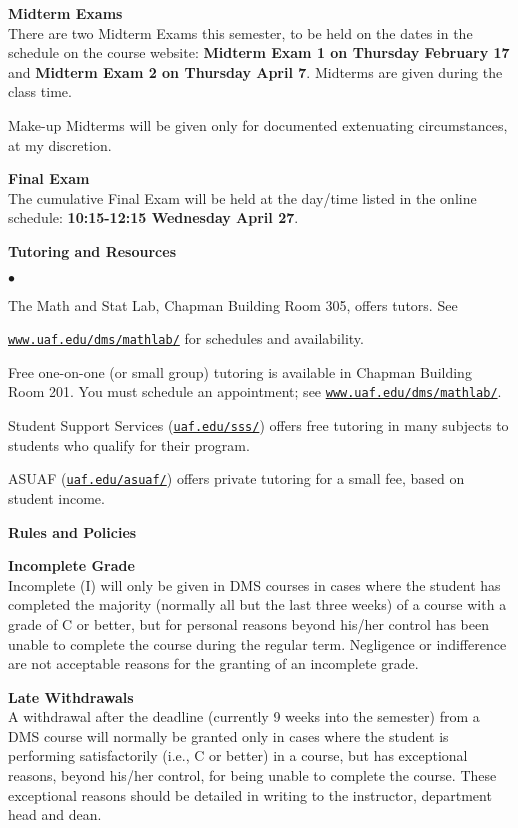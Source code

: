\documentclass[12pt]{article}
\renewcommand{\emph}[1]{\textsf{\textbf{#1}}}
\newcommand{\localhead}[1]{\par\smallskip\textbf{#1} \smallskip\nobreak\\}%
\def\heading#1{\localhead{\large\emph{#1}}}
\def\subheading#1{\localhead{\emph{#1}}}
\newenvironment{clist}%
{\bgroup\parskip 0pt\begin{list}{$\bullet$}{\partopsep 4pt\topsep 0pt\itemsep -2pt}}%
{\end{list}\egroup}%
\begin{document}
\heading{Midterm Exams}
There are two Midterm Exams this semester, to be held on the dates in the schedule on the course website: \emph{Midterm Exam 1 on Thursday February 17} and \emph{Midterm Exam 2 on Thursday April 7}.  Midterms are given during the class time.

Make-up Midterms will be given only for documented extenuating circumstances, at my discretion.


\heading{Final Exam} 
The cumulative Final Exam will be held at the day/time listed in the online schedule: \textbf{10:15-12:15 Wednesday April 27}.


\heading{Tutoring and Resources}
\vskip -30pt\strut
\begin{clist}
	\item The Math and Stat Lab, Chapman Building Room 305, offers tutors. 
	See 

	\href{http://www.uaf.edu/dms/mathlab/}{\texttt{www.uaf.edu/dms/mathlab/}} for schedules and availability.
	\item Free
one-on-one (or small group) tutoring is available in 
Chapman Building Room 201. You must schedule an
appointment; see \href{http://www.uaf.edu/dms/mathlab/}{\texttt{www.uaf.edu/dms/mathlab/}}.
	\item Student Support Services (\href{https://uaf.edu/sss/}{\texttt{uaf.edu/sss/}}) offers free tutoring in many subjects to students who qualify for their program.
	\item ASUAF (\href{https://uaf.edu/asuaf/}{\texttt{uaf.edu/asuaf/}}) offers private tutoring for a small fee, based on student income.
\end{clist}

\heading{Rules and Policies}
\vskip -20pt

\subheading{Incomplete Grade} 
Incomplete (I) will only be given in
  DMS courses in cases where
  the student has completed the majority (normally all but the last
  three weeks) of a course with a grade of C or better, but for
  personal reasons beyond his/her control has been unable to complete
  the course during the regular term. Negligence or indifference are
  not acceptable reasons for the granting of an incomplete
  grade. 

\clearpage\newpage
\subheading{Late Withdrawals} 
A withdrawal after the deadline
  (currently 9 weeks into the semester) from a DMS course will
  normally be granted only in cases where the student is performing
  satisfactorily (i.e., C or better) in a course, but has exceptional
  reasons, beyond his/her control, for being unable to complete the
  course. These exceptional reasons should be detailed in writing to
  the instructor, department head and dean.
\end{document}
